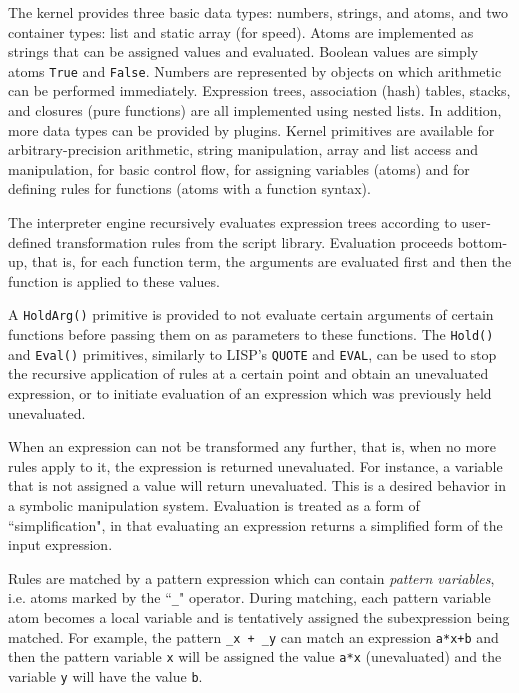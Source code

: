 \documentclass{llncs}
\begin{document}
The kernel provides three basic data types: numbers,
strings, and atoms, and two container types: list and static array (for speed).
Atoms are implemented as strings that can be assigned values and evaluated.
Boolean values are simply atoms \small{\texttt{True}} and \small{\texttt{False}}. Numbers are 
represented by objects on which arithmetic can be performed
immediately. Expression trees, association (hash) tables,
stacks, and closures (pure functions) are all implemented using nested lists. In
addition, more data types can be provided by plugins. Kernel primitives are
available for arbitrary-precision arithmetic, string manipulation, array and
list access and manipulation, for basic control flow, for assigning variables (atoms) and for defining rules for functions (atoms with a function syntax).

The interpreter engine recursively evaluates expression trees according to
user-defined transformation rules from the script library.
Evaluation proceeds bottom-up, that is, for each function term, the arguments are evaluated first and then the function is applied to these values.

A \small{\texttt{HoldArg()}} primitive is provided to not evaluate certain arguments of
certain functions before passing them on as parameters to these functions. The
\small{\texttt{Hold()}} and \small{\texttt{Eval()}} primitives, similarly to LISP's \small{\texttt{QUOTE}} and \small{\texttt{EVAL}}, can
be used to stop the recursive application of rules at a certain point and
obtain an unevaluated expression, or to initiate evaluation of an expression
which was previously held unevaluated.

When an expression can not be transformed any further, that is, when no more rules apply to it, the expression is returned
unevaluated. For instance, a variable that is not assigned a value will
return unevaluated. This is a desired behavior in a symbolic manipulation
system. Evaluation is treated as a form of ``simplification", in
that evaluating an expression returns a simplified form of the
input expression.

Rules are matched by a pattern expression which can contain \emph{pattern variables}, i.e. atoms marked by the ``\small{\texttt{\_}}" operator. During matching, each pattern variable atom becomes a local variable and is tentatively assigned the subexpression being matched. For example, the pattern \small{\texttt{\_x + \_y}} can match an expression \small{\texttt{a*x+b}} and then the pattern variable \small{\texttt{x}} will be assigned the value \small{\texttt{a*x}} (unevaluated) and the variable \small{\texttt{y}} will have the value \small{\texttt{b}}.
\end{document}
